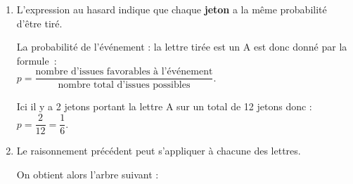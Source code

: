 \begin{corrige}
     \begin{enumerate}
          \item %
          L'expression \og au hasard \fg{} indique que chaque \textbf{jeton} a la même probabilité d'être tiré.
          \par
          La probabilité de l'événement : \og la lettre tirée est un A\fg{}  est donc donné par la formule~:\\
          $p=\dfrac{\text{nombre d'issues favorables à l'événement}}{\text{nombre total d'issues possibles}}.$
          \par
          Ici il y a 2 jetons portant la lettre A sur un total de 12 jetons donc :\\
          $p=\dfrac{2}{12}=\dfrac{1}{6}.$
          \item %
          Le raisonnement précédent peut s'appliquer à chacune des lettres.
          \par
          On obtient alors l'arbre suivant :
          \begin{center}
               \begin{extern}%
\end{extern}
\end{center}
\end{enumerate}
\end{corrige}
